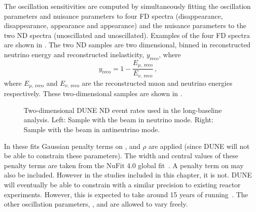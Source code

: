 The oscillation sensitivities are computed by simultaneously fitting the oscillation parameters and nuisance parameters to four FD spectra (\numu disappearance, \anumu disappearance, \nue appearance and \anue appearance) and the nuisance parameters to the two ND spectra (\numu unoscillated and \anumu unoscillated).
Examples of the four FD spectra are shown in .
The two ND samples are two dimensional, binned in reconstructed neutrino energy and reconstructed inelasticity, $y_{\text{reco}}$, where
\begin{equation}
	y_{\text{reco}} = 1 - \frac{E_{\mu,~\text{reco}}}{E_{\nu,~\text{reco}}} \, ,
\end{equation}
where $E_{\mu,~\text{reco}}$ and $E_{\nu,~\text{reco}}$ are the reconstructed muon and neutrino energies respectively.
These two-dimensional samples are shown in .

\begin{figure}[h]
	\begin{minipage}[t]{.5\linewidth}
		\begin{adjustbox}{max totalsize=\linewidth, center}
			
		\end{adjustbox}
	\end{minipage}
	\hfill
	\begin{minipage}[t]{.5\linewidth}
		\begin{adjustbox}{max totalsize=\linewidth, center}
			
		\end{adjustbox}
	\end{minipage}
	\caption[Two-dimensional DUNE ND event rates used in the long-baseline analysis]{Two-dimensional DUNE ND event rates used in the long-baseline analysis. Left: Sample with the beam in neutrino mode. Right: Sample with the beam in antineutrino mode.}
	\label{fig:ndEventRates}
\end{figure}

In these fits Gaussian penalty terms on ,  and $\rho$ are applied (since DUNE will not be able to constrain these parameters).
The width and central values of these penalty terms are taken from the NuFit 4.0 global fit~\cite{nufit4}.
A penalty term on  may also be included.
However in the studies included in this chapter, it is not.
DUNE will eventually be able to constrain  with a similar precision to existing reactor experiments. 
However, this is expected to take around 15 years of running~\cite{tdrVol2}.
The other oscillation parameters, ,  and \dcp are allowed to vary freely.

